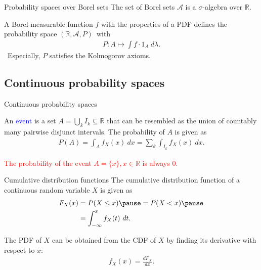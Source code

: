 \documentclass{beamer}
\def\padding{\vspace{0.5cm}}
\def\spadding{\vspace{0.25cm}}
\def\b{\textcolor{blue}}
\def\r{\textcolor{red}}
\begin{document}
\begin{frame}
    \begin{block}{Probability spaces over Borel sets}
        The set of Borel sets $\mathcal{A}$ is a $\sigma$-algebra over $\mathbb{R}$.\pause\par\spadding
        A Borel-measurable function $f$ with the properties of a PDF defines the probability space $(\mathbb{R}, \mathcal{A}, P)$\pause\ with \begin{align*}
            P : A \mapsto \int f \cdot 1_A\ d\lambda.
        \end{align*}\pause\ Especially, $P$ satisfies the Kolmogorov axioms.
    \end{block}
\end{frame}

\subsection{Continuous probability spaces}
\begin{frame}{Continuous probability spaces}
    \begin{definition}
        An \b{event} is a set $A = \bigcup_k I_k \subseteq \mathbb{R}$ that can be resembled as the union of countably many pairwise disjunct intervals. The probability of $A$ is given as
        \begin{align*}
            P(A) = \int_A f_X(x)\ dx = \sum_k \int_{I_k} f_X(x)\ dx.
        \end{align*}
    \end{definition}\pause\par\padding
    \r{The probability of the event $A = \{x\}, x \in \mathbb{R}$ is always $0$.}
\end{frame}

\begin{frame}
    \begin{block}{Cumulative distribution functions}
        The cumulative distribution function of a continuous random variable $X$ is given as
        \begin{align*}
            F_X(x) &= P(X \leq x)\pause = P(X < x)\pause \\
                   &= \int_{- \infty}^x f_X(t)\ dt.
        \end{align*}\pause\par\spadding
        The PDF of $X$ can be obtained from the CDF of $X$ by finding its derivative with respect to $x$:
        \begin{align*}
            f_X(x) = \frac{dF_X}{dx}.
        \end{align*}
    \end{block}
\end{frame}
\end{document}
